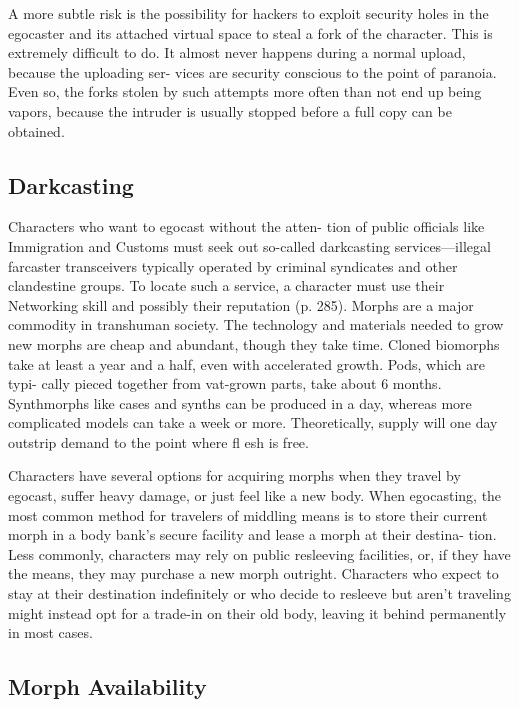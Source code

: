 A more subtle risk is the possibility for hackers to 
exploit security holes in the egocaster and its attached 
virtual space to steal a fork of the character. This is 
extremely difficult to do. It almost never happens 
during a normal upload, because the uploading ser-
vices are security conscious to the point of paranoia. 
Even so, the forks stolen by such attempts more often 
than not end up being vapors, because the intruder 
is usually stopped before a full copy can be obtained.

\subsection{Darkcasting}

Characters who want to egocast without the atten-
tion of public officials like Immigration and Customs 
must seek out so-called darkcasting services—illegal 
farcaster transceivers typically operated by criminal 
syndicates and other clandestine groups. To locate 
such a service, a character must use their Networking 
skill and possibly their reputation (p. 285).
Morphs are a major commodity in transhuman society. 
The technology and materials needed to grow new 
morphs are cheap and abundant, though they take 
time. Cloned biomorphs take at least a year and a half, 
even with accelerated growth. Pods, which are typi-
cally pieced together from vat-grown parts, take about 
6 months. Synthmorphs like cases and synths can be 
produced in a day, whereas more complicated models 
can take a week or more. Theoretically, supply will one 
day outstrip demand to the point where fl esh is free.

Characters have several options for acquiring 
morphs when they travel by egocast, suffer heavy 
damage, or just feel like a new body. When egocasting, 
the most common method for travelers of middling 
means is to store their current morph in a body bank's 
secure facility and lease a morph at their destina-
tion. Less commonly, characters may rely on public 
resleeving facilities, or, if they have the means, they 
may purchase a new morph outright. Characters who 
expect to stay at their destination indefinitely or who 
decide to resleeve but aren't traveling might instead 
opt for a trade-in on their old body, leaving it behind 
permanently in most cases.

\subsection{Morph Availability}

